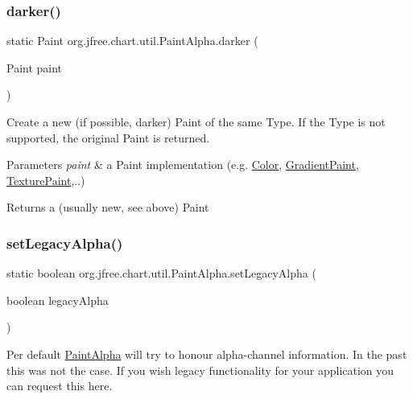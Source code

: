 \subsubsection{\texorpdfstring{darker()}{darker()}}
{\footnotesize\ttfamily static Paint org.\+jfree.\+chart.\+util.\+Paint\+Alpha.\+darker (\begin{DoxyParamCaption}\item[{Paint}]{paint }\end{DoxyParamCaption})\hspace{0.3cm}{\ttfamily [static]}}

Create a new (if possible, darker) {\ttfamily Paint} of the same Type. If the Type is not supported, the original {\ttfamily Paint} is returned. 


\begin{DoxyParams}{Parameters}
{\em paint} & a {\ttfamily Paint} implementation (e.\+g. \mbox{\hyperlink{}{Color}}, \mbox{\hyperlink{}{Gradient\+Paint}}, \mbox{\hyperlink{}{Texture\+Paint}},..) \\
\hline
\end{DoxyParams}
\begin{DoxyReturn}{Returns}
a (usually new, see above) {\ttfamily Paint} 
\end{DoxyReturn}
\mbox{\label{classorg_1_1jfree_1_1chart_1_1util_1_1_paint_alpha_acf74303de013426a46c2f87033d5dc17}} 
\subsubsection{\texorpdfstring{set\+Legacy\+Alpha()}{setLegacyAlpha()}}
{\footnotesize\ttfamily static boolean org.\+jfree.\+chart.\+util.\+Paint\+Alpha.\+set\+Legacy\+Alpha (\begin{DoxyParamCaption}\item[{boolean}]{legacy\+Alpha }\end{DoxyParamCaption})\hspace{0.3cm}{\ttfamily [static]}}

Per default {\ttfamily \mbox{\hyperlink{classorg_1_1jfree_1_1chart_1_1util_1_1_paint_alpha}{Paint\+Alpha}}} will try to honour alpha-\/channel information. In the past this was not the case. If you wish legacy functionality for your application you can request this here.



